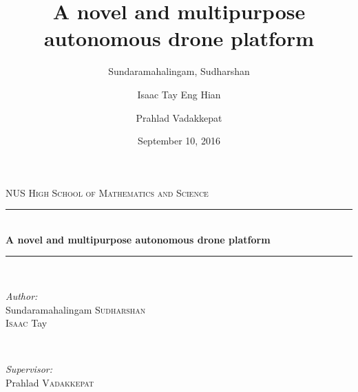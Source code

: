 \documentclass[12pt]{article}
\title{A novel and multipurpose autonomous drone platform}
\date{September 10, 2016}
\author{
	Sundaramahalingam, Sudharshan\\
	\and
	Isaac Tay Eng Hian\\
	\and
	Prahlad Vadakkepat
}
\begin{document}
\begin{titlepage}

\newcommand{\HRule}{\rule{\linewidth}{0.5mm}} %

\center %
 

\textsc{\LARGE NUS High School of Mathematics and Science}\\[1.5cm] %


\HRule \\[0.4cm]
{ \huge \bfseries A novel and multipurpose autonomous drone platform}\\[0.4cm] %
\HRule \\[1.5cm]
 

\begin{minipage}{0.4\textwidth}
\begin{flushleft} \large
\emph{Author:}\\
Sundaramahalingam \textsc{Sudharshan}  \\%
\textsc{Isaac} Tay %
\end{flushleft}
\end{minipage}
~
\begin{minipage}{0.4\textwidth}
\begin{flushright} \large
\emph{Supervisor:} \\
Prahlad \textsc{Vadakkepat} %
\end{flushright}
\end{minipage}\\[4cm]



\end{titlepage}
\end{document}
